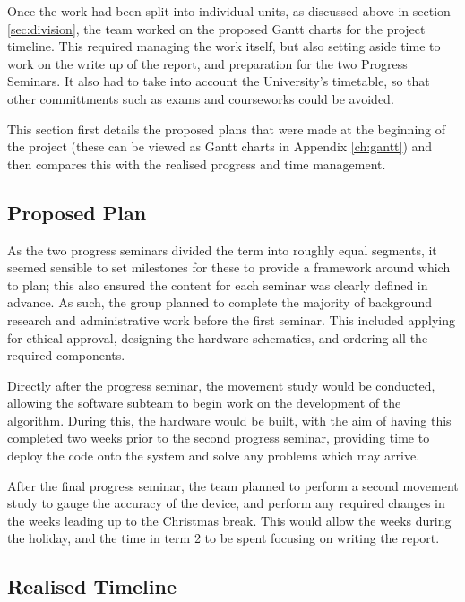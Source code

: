 
Once the work had been split into individual units, as discussed above in section \ref{sec:division}, the team worked on the proposed Gantt charts for the project timeline. This required managing the work itself, but also setting aside time to work on the write up of the report, and preparation for the two Progress Seminars. It also had to take into account the University's timetable, so that other committments such as exams and courseworks could be avoided.

This section first details the proposed plans that were made at the beginning of the project (these can be viewed as Gantt charts in Appendix \ref{ch:gantt}) and then compares this with the realised progress and time management.

\subsection{Proposed Plan}

As the two progress seminars divided the term into roughly equal segments, it seemed sensible to set milestones for these to provide a framework around which to plan; this also ensured the content for each seminar was clearly defined in advance. As such, the group planned to complete the majority of background research and administrative work before the first seminar. This included applying for ethical approval, designing the hardware schematics, and ordering all the required components.

Directly after the progress seminar, the movement study would be conducted, allowing the software subteam to begin work on the development of the algorithm. During this, the hardware would be built, with the aim of having this completed two weeks prior to the second progress seminar, providing time to deploy the code onto the system and solve any problems which may arrive.

After the final progress seminar, the team planned to perform a second movement study to gauge the accuracy of the device, and perform any required changes in the weeks leading up to the Christmas break. This would allow the weeks during the holiday, and the time in term 2 to be spent focusing on writing the report.

\subsection{Realised Timeline}